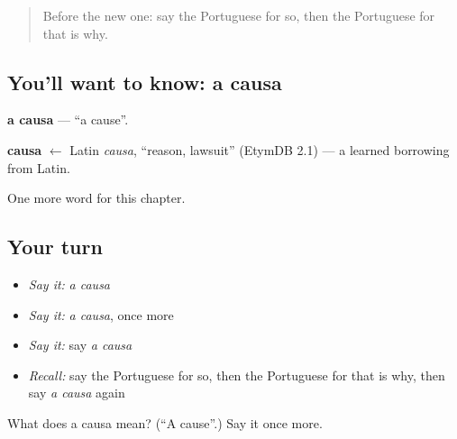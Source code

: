 \label{lesson:PT-C84-causa}



\begin{quote}
Before the new one: say the Portuguese for so, then the Portuguese for that is why.
\end{quote}

\subsection*{You'll want to know: a causa}
\textbf{a causa} — \textquotedblleft{}a cause\textquotedblright{}.

\begin{cousinweb}
\textbf{causa} $\leftarrow$ Latin \emph{causa}, \textquotedblleft{}reason, lawsuit\textquotedblright{} (EtymDB 2.1) — a learned borrowing from Latin.
\end{cousinweb}

\begin{grammarlens}[title={What you've built}]
One more word for this chapter.
\end{grammarlens}

\subsection*{Your turn}
\begin{itemize}
\raggedright
  \item \emph{Say it:} \emph{a causa}
  \item \emph{Say it:} \emph{a causa}, once more
  \item \emph{Say it:} say \emph{a causa}
  \item \emph{Recall:} say the Portuguese for so, then the Portuguese for that is why, then say \emph{a causa} again
\end{itemize}

\begin{tcolorbox}[breakable,colback=teal!4,colframe=teal!35!black,title={Before you move on}]
What does a causa mean? (\textquotedblleft{}A cause\textquotedblright{}.) Say it once more.
\end{tcolorbox}

